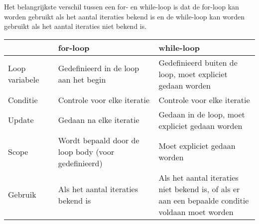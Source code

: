 Het belangrijkste verschil tussen een for- en while-loop is dat de for-loop kan worden gebruikt als het aantal iteraties bekend is en de while-loop kan worden gebruikt als het aantal iteraties niet bekend is.

\begin{table}[ht]
\centering
\begin{tabular}{ |p{0.2\linewidth}|p{0.4\linewidth}|p{0.4\linewidth}| }
\hline
\rowcolor{gray!60}
& for-loop & while-loop \\
\hline
Loop variabele & Gedefinieerd in de loop aan het begin & Gedefinieerd buiten de loop, moet expliciet gedaan worden \\
\hline
Conditie & Controle voor elke iteratie & Controle voor elke iteratie \\
\hline
Update & Gedaan na elke iteratie & Gedaan in de loop, moet expliciet gedaan worden \\
\hline
Scope & Wordt bepaald door de loop body (voor gedefinieerd) & Moet expliciet gedaan worden \\
\hline
Gebruik & Als het aantal iteraties bekend is & Als het aantal iteraties niet bekend is, of als er aan een bepaalde conditie voldaan moet worden \\
\hline
\end{tabular}
\end{table}
